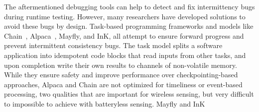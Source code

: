 The aftermentioned debugging tools can help to detect and fix intermittency bugs during runtime testing. However, many researchers have developed solutions to avoid these bugs by design.
Task-based programming frameworks and models like
Chain~\cite{colin2016chain}, Alpaca~\cite{maeng2017alpaca}, Mayfly, and InK, all attempt to ensure forward progress and prevent intermittent consistency bugs.
The task model splits a software application into idempotent code blocks that read inputs from other tasks, and upon completion write their own results to channels of non-volatile memory.
While they ensure safety and improve performance over checkpointing-based approaches, Alpaca and Chain are not optimized for timeliness or event-based processing, two qualities that are important for wireless sensing, but very difficult to impossible to achieve with batteryless sensing.
Mayfly and InK

